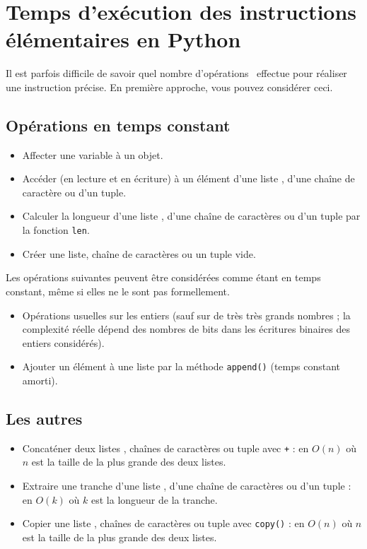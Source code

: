 \section{Temps d'exécution des instructions élémentaires en Python}

Il est parfois difficile de savoir quel nombre d'opérations \python\ effectue pour réaliser une instruction précise. 
En première approche, vous pouvez considérer ceci.

\subsection{Opérations en temps constant}

\begin{itemize}
  \item Affecter une variable à un objet.
  \item Accéder (en lecture et en écriture) à un élément d'une liste \python, d'une chaîne de caractère ou d'un tuple. 
  \item Calculer la longueur d'une liste \python, d'une chaîne de caractères ou d'un tuple par la fonction \lstinline{len}.
  \item Créer une liste, chaîne de caractères ou un tuple vide.
\end{itemize}

Les opérations suivantes peuvent être considérées comme étant en temps constant, même si elles ne le sont pas formellement.

\begin{itemize}
  \item Opérations usuelles sur les entiers (sauf sur de très très grands nombres ; la complexité réelle dépend des nombres de bits dans les écritures binaires des entiers considérés).
  \item Ajouter un élément à une liste par la méthode \lstinline{append()} (temps constant amorti).
\end{itemize}

\subsection{Les autres}

\begin{itemize}
  \item Concaténer deux listes \python, chaînes de caractères ou tuple avec \lstinline{+} : en $O(n)$ où $n$ est la taille de la plus grande des deux listes.
  \item Extraire une tranche d'une liste \python, d'une chaîne de caractères ou d'un tuple : en $O(k)$ où $k$ est la longueur de la tranche.
  \item Copier une liste \python, chaînes de caractères ou tuple avec \lstinline{copy()} : en $O(n)$ où $n$ est la taille de la plus grande des deux listes.
\end{itemize}

